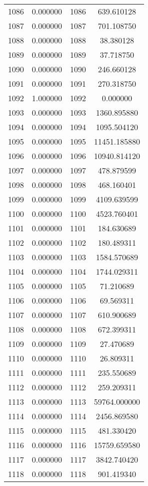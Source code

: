 \documentclass[12pt]{article}
\begin{document}
\begin{longtable}{@{}cccc@{}}
1086 & 0.000000 & 1086 & 639.610128 \\
1087 & 0.000000 & 1087 & 701.108750 \\
1088 & 0.000000 & 1088 & 38.380128 \\
1089 & 0.000000 & 1089 & 37.718750 \\
1090 & 0.000000 & 1090 & 246.660128 \\
1091 & 0.000000 & 1091 & 270.318750 \\
1092 & 1.000000 & 1092 & 0.000000 \\
1093 & 0.000000 & 1093 & 1360.895880 \\
1094 & 0.000000 & 1094 & 1095.504120 \\
1095 & 0.000000 & 1095 & 11451.185880 \\
1096 & 0.000000 & 1096 & 10940.814120 \\
1097 & 0.000000 & 1097 & 478.879599 \\
1098 & 0.000000 & 1098 & 468.160401 \\
1099 & 0.000000 & 1099 & 4109.639599 \\
1100 & 0.000000 & 1100 & 4523.760401 \\
1101 & 0.000000 & 1101 & 184.630689 \\
1102 & 0.000000 & 1102 & 180.489311 \\
1103 & 0.000000 & 1103 & 1584.570689 \\
1104 & 0.000000 & 1104 & 1744.029311 \\
1105 & 0.000000 & 1105 & 71.210689 \\
1106 & 0.000000 & 1106 & 69.569311 \\
1107 & 0.000000 & 1107 & 610.900689 \\
1108 & 0.000000 & 1108 & 672.399311 \\
1109 & 0.000000 & 1109 & 27.470689 \\
1110 & 0.000000 & 1110 & 26.809311 \\
1111 & 0.000000 & 1111 & 235.550689 \\
1112 & 0.000000 & 1112 & 259.209311 \\
1113 & 0.000000 & 1113 & 59764.000000 \\
1114 & 0.000000 & 1114 & 2456.869580 \\
1115 & 0.000000 & 1115 & 481.330420 \\
1116 & 0.000000 & 1116 & 15759.659580 \\
1117 & 0.000000 & 1117 & 3842.740420 \\
1118 & 0.000000 & 1118 & 901.419340 \\

\end{longtable}
\end{document}
